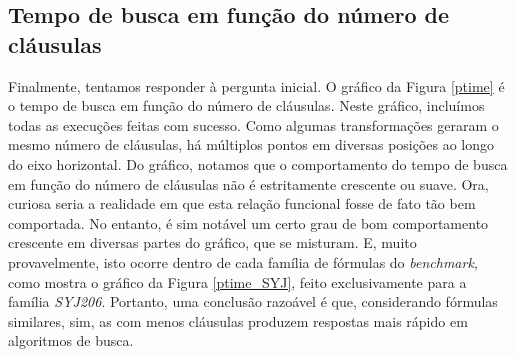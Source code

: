 \subsection{Tempo de busca em função do número de cláusulas}



\indent

Finalmente, tentamos responder à pergunta inicial. O gráfico da Figura \ref{ptime} é o tempo de busca em função do número de cláusulas. Neste gráfico, incluímos todas as execuções feitas com sucesso. Como algumas transformações geraram o mesmo número de cláusulas, há múltiplos pontos em diversas posições ao longo do eixo horizontal. Do gráfico, notamos que o comportamento do tempo de busca em função do número de cláusulas não é estritamente crescente ou suave. Ora, curiosa seria a realidade em que esta relação funcional fosse de fato tão bem comportada. No entanto, é sim notável um certo grau de bom comportamento crescente em diversas partes do gráfico, que se misturam. E, muito provavelmente, isto ocorre dentro de cada família de fórmulas do \emph{benchmark}, como mostra o gráfico da Figura \ref{ptime_SYJ}, feito exclusivamente para a família \emph{SYJ206}. Portanto, uma conclusão razoável é que, considerando fórmulas similares, sim, as com menos cláusulas produzem respostas mais rápido em algoritmos de busca.
